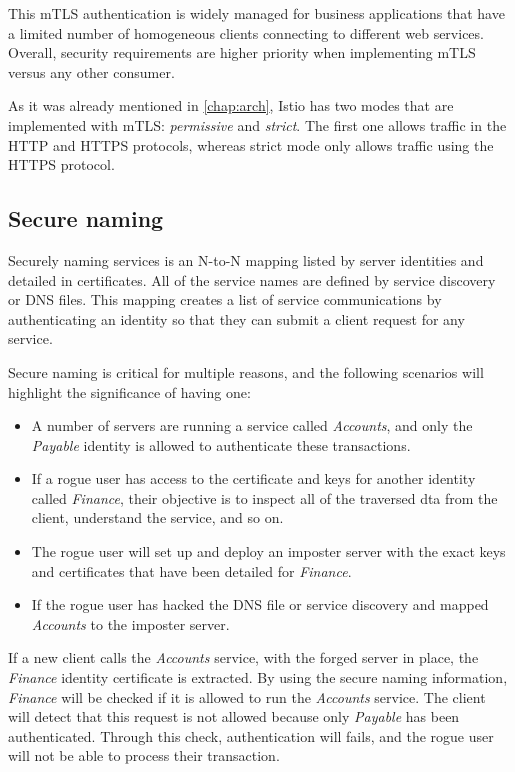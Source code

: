This mTLS authentication is widely managed for business applications that have a limited number of homogeneous clients connecting to different web services. Overall, security requirements are higher priority when implementing mTLS versus any other consumer.

As it was already mentioned in \ref{chap:arch}, Istio has two modes that are implemented with mTLS: \textit{permissive} and \textit{strict}. The first one allows traffic in the HTTP and HTTPS protocols, whereas strict mode only allows traffic using the HTTPS protocol.

\subsection{Secure naming}
Securely naming services is an N-to-N mapping listed by server identities and detailed in certificates. All of the service names are defined by service discovery or DNS files. This mapping creates a list of service communications by authenticating an identity so that they can submit a client request for any service.

Secure naming is critical for multiple reasons, and the following scenarios will highlight the significance of having one:

\begin{itemize}
    \item A number of servers are running a service called \textit{Accounts}, and only the \textit{Payable} identity is allowed to authenticate these transactions.
    \item If a rogue user has access to the certificate and keys for another identity called \textit{Finance}, their objective is to inspect all of the traversed dta from the client, understand the service, and so on.
    \item The rogue user will set up and deploy an imposter server with the exact keys and certificates that have been detailed for \textit{Finance}.
    \item If the rogue user has hacked the DNS file or service discovery and mapped \textit{Accounts} to the imposter server.
\end{itemize}

If a new client calls the \textit{Accounts} service, with the forged server in place, the \textit{Finance} identity certificate is extracted. By using the secure naming information, \textit{Finance} will be checked if it is allowed to run the \textit{Accounts} service. The client will detect that this request is not allowed because only \textit{Payable} has been authenticated. Through this check, authentication will fails, and the rogue user will not be able to process their transaction.

